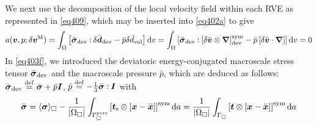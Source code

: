 \documentclass[10pt,a4paper]{article}
\newcommand{\pore}{\mathrm{pore}}
\begin{document}
We next use the decomposition of the local velocity field within each RVE as represented in \eqref{eq409}, which may be inserted into \eqref{eq402a} to give
\begin{equation}
    a(\boldsymbol{v},p; \delta \boldsymbol{v}^{\mathrm{M}}) =
    \int_\Omega
    \left[\bar{\boldsymbol{\sigma}}_{\mathrm{dev}} \mathbin{\vcentcolon} \delta\bar{\boldsymbol{d}}_{\mathrm{dev}} -
    \bar{p}\delta\bar{d}_{\mathrm{vol}}\right] \operatorname{d \!} v =
    \int_\Omega
    \left[\bar{\boldsymbol{\sigma}}_{\mathrm{dev}} \mathbin{\vcentcolon} \left[\delta\bar{\boldsymbol{v}}\mathbin{\otimes}\boldsymbol{\nabla}\right]^{\mathrm{sym}}_{\mathrm{dev}} -
    \bar{p}\left[\delta\bar{\boldsymbol{v}}\cdot\boldsymbol{\nabla}\right]\right]
    \operatorname{d \!} v = 0
    \label{eq403f}
\end{equation}
In \eqref{eq403f}, we introduced the deviatoric energy-conjugated macroscale stress tensor $\bar{\boldsymbol{\sigma}}_{\mathrm{dev}}$ and the macroscale pressure $\bar{p}$, which are deduced as follows: $\bar{\boldsymbol{\sigma}}_{\mathrm{dev}}\overset{\mathrm{def}}{=}\bar{\boldsymbol{\sigma}}+\bar{p}\boldsymbol{I}$, $\bar{p}\overset{\mathrm{def}}{=}-\frac{1}{3}\bar{\boldsymbol{\sigma}}\mathbin{\vcentcolon}\boldsymbol{I}$ with
\begin{equation}
    \bar{\ts\sigma} =
    \langle \ts{\sigma} \rangle_\Box - 
    \frac{1}{|\Omega_\Box|}\int_{\Gamma_\Box^\pore} \left[\ta{t}_\fluct\outerp[\ta{x}-\bar{\ta{x}}]\right]^\sym \dif a =
    \frac{1}{|\Omega_\Box|}\int_{\Gamma_\Box} \left[\ta{t}\outerp[\ta{x}-\bar{\ta{x}}]\right]^\sym \dif a
\end{equation}
\end{document}
